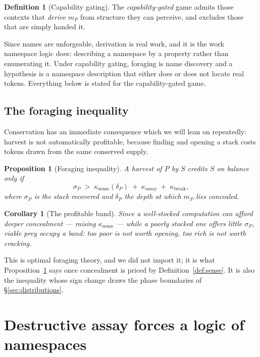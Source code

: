 \documentclass[11pt]{article}
\theoremstyle{plain}
\newtheorem{proposition}[theorem]{Proposition}
\newtheorem{corollary}[theorem]{Corollary}
\theoremstyle{definition}
\newtheorem{definition}[theorem]{Definition}
\begin{document}
\begin{definition}[Capability gating]
The \emph{capability-gated} game admits those contexts that \emph{derive} $m_P$ from structure they
can perceive, and excludes those that are simply handed it.
\end{definition}

Since names are unforgeable, derivation is real work, and it is the work namespace logic does:
describing a namespace by a property rather than enumerating it. Under capability gating, foraging is
name discovery and a hypothesis is a namespace description that either does or does not locate real
tokens. Everything below is stated for the capability-gated game.

\subsection{The foraging inequality}

Conservation has an immediate consequence which we will lean on repeatedly: harvest is not
automatically profitable, because finding and opening a stack costs tokens drawn from the same
conserved supply.

\begin{proposition}[Foraging inequality]
\label{prop:foraging}
A harvest of $P$ by $S$ credits $S$ on balance only if
\[
\sigma_P \;>\; \kappa_{\mathrm{sense}}(\delta_P) \;+\; \kappa_{\mathrm{assay}} \;+\;
\kappa_{\mathrm{break}},
\]
where $\sigma_P$ is the stack recovered and $\delta_P$ the depth at which $m_P$ lies concealed.
\end{proposition}

\begin{corollary}[The profitable band]
\label{cor:band}
Since a well-stocked computation can afford deeper concealment --- raising $\kappa_{\mathrm{sense}}$
--- while a poorly stocked one offers little $\sigma_P$, viable prey occupy a band: too poor is not
worth opening, too rich is not worth cracking.
\end{corollary}

This is optimal foraging theory, and we did not import it; it is what Proposition~\ref{prop:foraging}
says once concealment is priced by Definition~\ref{def:sense}. It is also the inequality whose sign
change draws the phase boundaries of \S\ref{sec:distributions}.

\section{Destructive assay forces a logic of namespaces}
\label{sec:forced}
\end{document}

